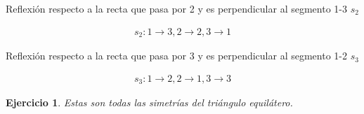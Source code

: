 \documentclass{article}
\newtheorem{exercise}[theorem]{Ejercicio}
\begin{document}
Reflexión respecto a la recta que pasa por 2 y es perpendicular al segmento 1-3 $s_2$

\begin{align*}
  s_2: 1 \rightarrow 3, 2 \rightarrow 2, 3 \rightarrow 1
\end{align*}

Reflexión respecto a la recta que pasa por 3 y es perpendicular al segmento 1-2 $s_3$

\begin{align*}
  s_3: 1 \rightarrow 2, 2 \rightarrow 1, 3 \rightarrow 3
\end{align*}

\begin{exercise}
  Estas son todas las simetrías del triángulo equilátero.
\end{exercise}
\end{document}
